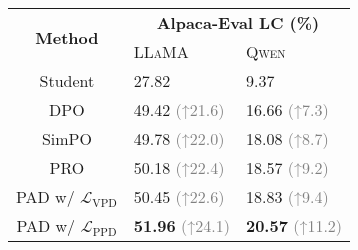 
\begin{table}[!tp]
\small
\centering
\setlength{\tabcolsep}{1.3em}
\renewcommand{\arraystretch}{1.4}
\begin{tabular}{cll}
\hline
\multirow{2}{*}{\textbf{Method}} & \multicolumn{2}{c}{\textbf{Alpaca-Eval LC (\%)}} \\ \cline{2-3} 
 & \textsc{LLaMA} & \textsc{Qwen} \\ \hline
Student & 27.82 & 9.37  \\ \hline
DPO   & 49.42 \textcolor{gray}{\scriptsize{(↑21.6)}} & 16.66 \textcolor{gray}{\scriptsize{(↑7.3)}}    \\ 
SimPO & 49.78 \textcolor{gray}{\scriptsize{(↑22.0)}} & 18.08 \textcolor{gray}{\scriptsize{(↑8.7)}}   \\ 
PRO   & 50.18 \textcolor{gray}{\scriptsize{(↑22.4)}} & 18.57 \textcolor{gray}{\scriptsize{(↑9.2)}}   \\ \cline{1-3} 
PAD w/ $\mathcal{L}_\text{VPD}$ & 50.45 \textcolor{gray}{\scriptsize{(↑22.6)}} & 18.83 \textcolor{gray}{\scriptsize{(↑9.4)}} \\
PAD w/ $\mathcal{L}_\text{PPD}$ & \textbf{51.96} \textcolor{gray}{\scriptsize{(↑24.1)}} & \textbf{20.57} \textcolor{gray}{\scriptsize{(↑11.2)}}  \\ \hline
\end{tabular}
\vspace{-2mm}
\caption{}
\vspace{-5mm}
\label{tab:heterogeneous}
\end{table}

